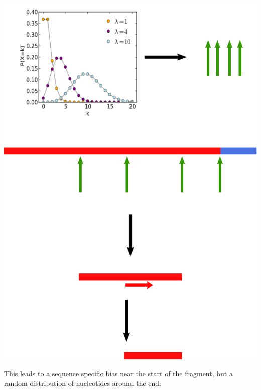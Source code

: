 \begin{center}
\includegraphics[scale=0.6]{pix/after_prim.pdf}
\end{center}

This leads to a sequence specific bias near the start of the fragment, but a random distribution of nucleotides around the end:

